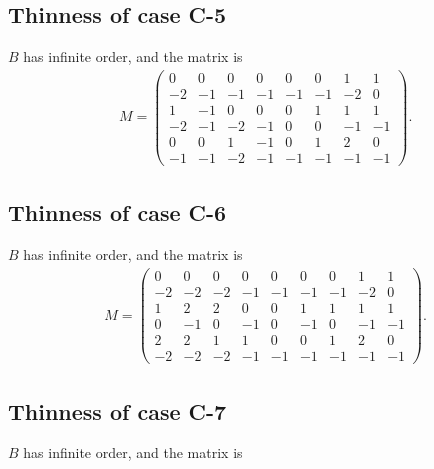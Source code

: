 \documentclass[11pt,a4paper]{amsart}
\theoremstyle{definition}
\theoremstyle{definition}
\numberwithin{equation}{section}
\begin{document}
\subsection{Thinness of case C-5}
$B$ has infinite order, and the matrix is
\begin{align*}
& M=\left(\begin{array}{rrrrrrrr}
0 & 0 & 0 & 0 & 0 & 0 & 1 & 1 \\
-2 & -1 & -1 & -1 & -1 & -1 & -2 & 0 \\
1 & -1 & 0 & 0 & 0 & 1 & 1 & 1 \\
-2 & -1 & -2 & -1 & 0 & 0 & -1 & -1 \\
0 & 0 & 1 & -1 & 0 & 1 & 2 & 0 \\
-1 & -1 & -2 & -1 & -1 & -1 & -1 & -1
\end{array}\right).
\end{align*}

\subsection{Thinness of case C-6}
$B$ has infinite order, and the matrix is
\begin{align*}
& M= \left(\begin{array}{rrrrrrrrr}
0 & 0 & 0 & 0 & 0 & 0 & 0 & 1 & 1 \\
-2 & -2 & -2 & -1 & -1 & -1 & -1 & -2 & 0 \\
1 & 2 & 2 & 0 & 0 & 1 & 1 & 1 & 1 \\
0 & -1 & 0 & -1 & 0 & -1 & 0 & -1 & -1 \\
2 & 2 & 1 & 1 & 0 & 0 & 1 & 2 & 0 \\
-2 & -2 & -2 & -1 & -1 & -1 & -1 & -1 & -1
\end{array}\right).
\end{align*}

\subsection{Thinness of case C-7}
$B$ has infinite order, and the matrix is

\end{document}
